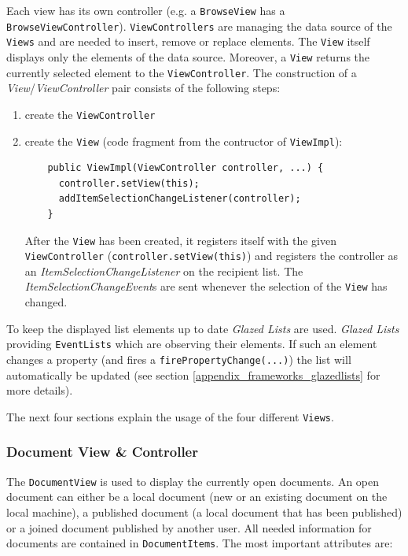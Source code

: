 Each view has its own controller (e.g. a \texttt{Browse\-View} has a \texttt{Browse\-View\-Controller}). \texttt{View\-Controllers} are managing the data source of the \texttt{Views} and are needed to insert, remove or replace elements. The \texttt{View} itself displays only the elements of the data source. Moreover, a \texttt{View} returns the currently selected element to the \texttt{View\-Controller}. The construction of a \emph{View}/\emph{ViewController} pair consists of the following steps:

\begin{enumerate}
\item create the \texttt{View\-Controller}
\item create the \texttt{View} (code fragment from the contructor of \texttt{ViewImpl}):

  \begin{verbatim}
    public ViewImpl(ViewController controller, ...) {
      controller.setView(this);
      addItemSelectionChangeListener(controller);
    }
  \end{verbatim}
  
After the \texttt{View} has been created, it registers itself with the given \texttt{View\-Controller} (\texttt{controller.setView(this)}) and registers the controller as an \emph{Item\-Selection\-Change\-Listener} on the recipient list. The \emph{Item\-Selection\-Change\-Event}s are sent whenever the selection of the \texttt{View} has changed.
\end{enumerate}

To keep the displayed list elements up to date \emph{Glazed Lists} are used. \emph{Glazed Lists} providing \texttt{Event\-Lists} which are observing their elements. If such an element changes a property (and fires a \texttt{firePropertyChange(...)}) the list will automatically be updated (see section \ref{appendix_frameworks_glazedlists} for more details).

The next four sections explain the usage of the four different \texttt{Views}.

\subsubsection{Document View \& Controller}
The \texttt{Document\-View} is used to display the currently open documents. An open document can either be a local document (new or an existing document on the local machine), a published document (a local document that has been published) or a joined document published by another user. All needed information for documents are contained in \texttt{Document\-Items}. The most important attributes are:

